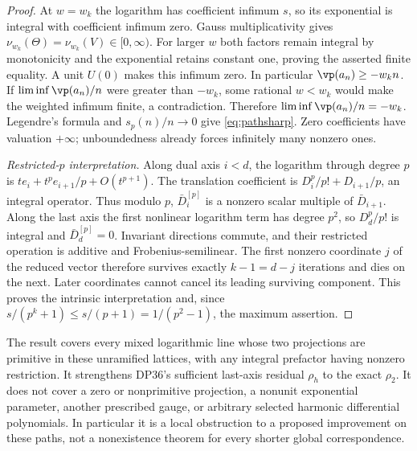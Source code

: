 \begin{proof}
At $w=w_k$ the logarithm has coefficient infimum $s$, so its exponential is integral with coefficient infimum zero. Gauss multiplicativity gives
$\nu_{w_k}(\Theta)=\nu_{w_k}(V)\in[0,\infty)$.
For larger $w$ both factors remain integral by monotonicity and the exponential retains constant one, proving the asserted finite equality. A unit $U(0)$ makes this infimum zero.
In particular $\vp(a_n)\ge-w_kn$. If $\liminf\vp(a_n)/n$ were greater than $-w_k$, some rational $w<w_k$ would make the weighted infimum finite, a contradiction. Therefore $\liminf\vp(a_n)/n=-w_k$.
Legendre's formula and $s_p(n)/n\to0$ give \eqref{eq:pathsharp}. Zero coefficients have valuation $+\infty$; unboundedness already forces infinitely many nonzero ones.

\emph{Restricted-$p$ interpretation.}
Along dual axis $i<d$, the logarithm through degree $p$ is
$te_i+t^pe_{i+1}/p+O(t^{p+1})$.
The translation coefficient is
$D_i^p/p!+D_{i+1}/p$, an integral operator. Thus modulo $p$,
$\bar D_i^{[p]}$ is a nonzero scalar multiple of $\bar D_{i+1}$.
Along the last axis the first nonlinear logarithm term has degree $p^2$, so $D_d^p/p!$ is integral and $\bar D_d^{[p]}=0$.
Invariant directions commute, and their restricted operation is additive and Frobenius-semilinear. The first nonzero coordinate $j$ of the reduced vector therefore survives exactly $k-1=d-j$ iterations and dies on the next. Later coordinates cannot cancel its leading surviving component. This proves the intrinsic interpretation and, since $s/(p^k+1)\le s/(p+1)=1/(p^2-1)$, the maximum assertion.
\end{proof}

The result covers every mixed logarithmic line whose two projections are primitive in these unramified lattices, with any integral prefactor having nonzero restriction. It strengthens DP36's sufficient last-axis residual $\rho_h$ to the exact $\rho_2$. It does not cover a zero or nonprimitive projection, a nonunit exponential parameter, another prescribed gauge, or arbitrary selected harmonic differential polynomials. In particular it is a local obstruction to a proposed improvement on these paths, not a nonexistence theorem for every shorter global correspondence.

